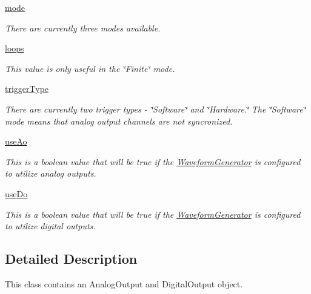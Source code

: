 \begin{DoxyCompactItemize}
\hyperlink{class_waveform_generator_1_1_waveform_generator_ab11b448ff5baf7c87021af3cddfa49d0}{mode}
\begin{DoxyCompactList}\small\item\em There are currently three modes available. \end{DoxyCompactList}\item 
\hyperlink{class_waveform_generator_1_1_waveform_generator_aa36d19f0d2c8700947394d01b6b4621a}{loops}
\begin{DoxyCompactList}\small\item\em This value is only useful in the \char`\"{}\-Finite\char`\"{} mode. \end{DoxyCompactList}\item 
\hyperlink{class_waveform_generator_1_1_waveform_generator_a240878363858425aa6c8d25241479dbf}{trigger\-Type}
\begin{DoxyCompactList}\small\item\em There are currently two trigger types -\/ \char`\"{}\-Software\char`\"{} and \char`\"{}\-Hardware.\char`\"{} The \char`\"{}\-Software\char`\"{} mode means that analog output channels are not syncronized. \end{DoxyCompactList}\item 
\hyperlink{class_waveform_generator_1_1_waveform_generator_abd9a10ccc783ec4174a7ee9f8ab170ad}{use\-Ao}
\begin{DoxyCompactList}\small\item\em This is a boolean value that will be true if the \hyperlink{class_waveform_generator_1_1_waveform_generator}{Waveform\-Generator} is configured to utilize analog outputs. \end{DoxyCompactList}\item 
\hyperlink{class_waveform_generator_1_1_waveform_generator_a68e8bdc6d3cf0b402502766186571d6f}{use\-Do}
\begin{DoxyCompactList}\small\item\em This is a boolean value that will be true if the \hyperlink{class_waveform_generator_1_1_waveform_generator}{Waveform\-Generator} is configured to utilize digital outputs. \end{DoxyCompactList}\end{DoxyCompactItemize}


\subsection{Detailed Description}
This class contains an Analog\-Output and Digital\-Output object. 


